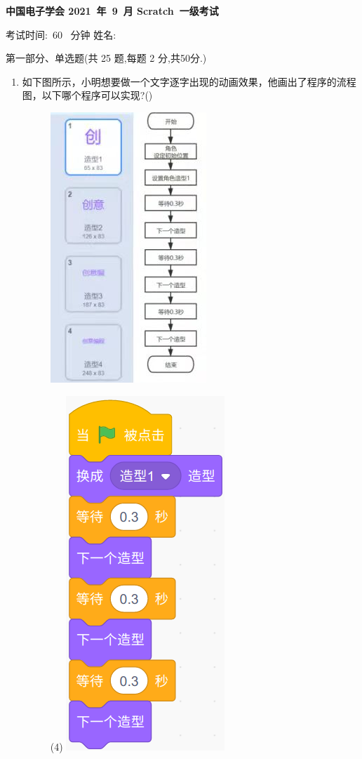 \documentclass[10pt, a4paper]{article}
\newcommand{\Title}[3]{
    \begin{center}
        \Large \textbf{中国电子学会 #1~年~#2~月 Scratch~#3级考试}
    \end{center}
}
\newcommand{\TimeAndName}[1]{
    \begin{center}
        考试时间:~#1~ 分钟 \qquad\qquad\qquad\qquad 姓名:\underline{\quad\quad\quad\quad}
    \end{center}
}
\begin{document}
    \Title{2021}{9}{一}
    
    \TimeAndName{60}
    
    {\noindent\heiti 第一部分、单选题(共 25 题,每题 2 分,共50分.)}

    \begin{enumerate}
        \item  如下图所示，小明想要做一个文字逐字出现的动画效果，他画出了程序的流程图，以下哪个程序可以实现?(\qquad)
        \begin{figure}[htbp]
            \centering
            \begin{minipage}{.28\textwidth}
                \centering
                \includegraphics[width=.6\textwidth]{1.jpg}
            \end{minipage}
            \begin{minipage}{.68\textwidth}
                \centering
                \begin{tasks}(4)
                    \task \includegraphics[width=.17\textwidth]{1a.png}

\end{tasks}
\end{minipage}
\end{figure}
\end{enumerate}
\end{document}
